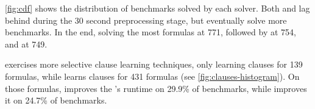 \autoref{fig:cdf} shows the distribution of benchmarks solved by each solver.
Both \prelearn and \tool lag behind \cadical during the 30 second preprocessing
stage, but eventually solve more benchmarks. In the end, \prelearn solving the most
formulas at 771, followed by \tool at 754, and \cadical at 749. 






\tool exercises more selective \pr clause learning techniques, only learning \pr
clauses for 139 formulas, while \prelearn learns \pr clauses for 431 formulas
(see \autoref{fig:clauses-histogram}). On those formulas, \tool improves the
\cadical's runtime on 29.9\% of benchmarks, while \prelearn improves it on
24.7\% of benchmarks.





















